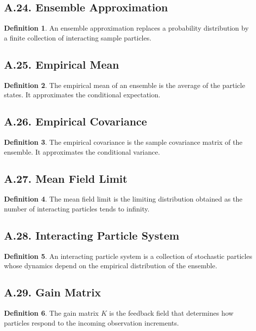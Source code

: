 \documentclass[11pt]{article}
\theoremstyle{definition}
\newtheorem{definition}{Definition}
\theoremstyle{remark}
\begin{document}
\subsection*{A.24. Ensemble Approximation}
\begin{definition}
An ensemble approximation replaces a probability distribution by a finite collection of interacting sample particles.
\end{definition}

\subsection*{A.25. Empirical Mean}
\begin{definition}
The empirical mean of an ensemble is the average of the particle states. It approximates the conditional expectation.
\end{definition}

\subsection*{A.26. Empirical Covariance}
\begin{definition}
The empirical covariance is the sample covariance matrix of the ensemble. It approximates the conditional variance.
\end{definition}

\subsection*{A.27. Mean Field Limit}
\begin{definition}
The mean field limit is the limiting distribution obtained as the number of interacting particles tends to infinity.
\end{definition}

\subsection*{A.28. Interacting Particle System}
\begin{definition}
An interacting particle system is a collection of stochastic particles whose dynamics depend on the empirical distribution of the ensemble.
\end{definition}

\subsection*{A.29. Gain Matrix}
\begin{definition}
The gain matrix \(K\) is the feedback field that determines how particles respond to the incoming observation increments.
\end{definition}
\end{document}
